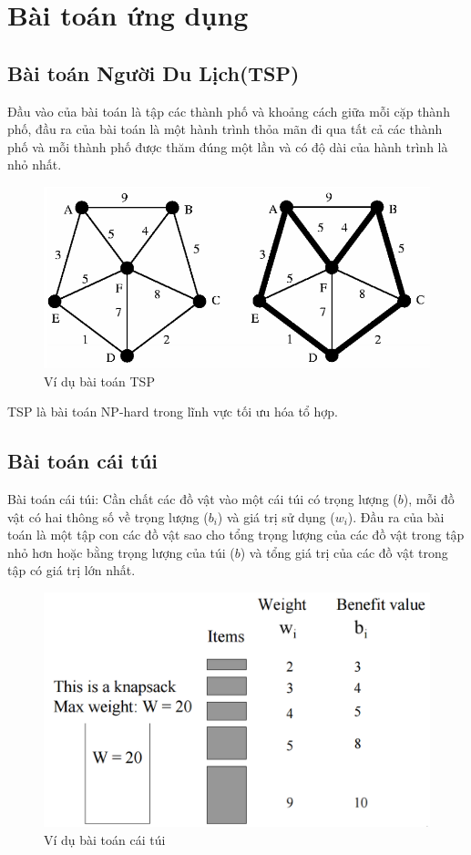 \documentclass[a4paper,12pt]{report}
\begin{document}
\section{Bài toán ứng dụng}
\subsection{Bài toán Người Du Lịch(TSP)}
Đầu vào của bài toán là tập các thành phố và khoảng cách giữa mỗi cặp thành phố, đầu ra của bài toán là một hành trình thỏa mãn đi qua tất cả các thành phố và mỗi thành phố được thăm đúng một lần và có độ dài của hành trình là nhỏ nhất.\\

\begin{figure}[H]
\center
\includegraphics[scale=0.5]{TSP_example.PNG}
\caption{Ví dụ bài toán TSP}
\end{figure}

TSP là bài toán NP-hard trong lĩnh vực tối ưu hóa tổ hợp.
\subsection{Bài toán cái túi}
Bài toán cái túi: Cần chất các đồ vật vào một cái túi có trọng lượng ($b$), mỗi đồ vật có hai thông số về trọng lượng ($b_i$) và giá trị sử dụng ($w_i$). Đầu ra của bài toán là một tập con các đồ vật sao cho tổng trọng lượng của các đồ vật trong tập nhỏ hơn hoặc bằng trọng lượng của túi ($b$) và tổng giá trị của các đồ vật trong tập có giá trị lớn nhất.
\begin{figure}[H]
\center
\includegraphics[scale=0.5]{KP_example.PNG}
\caption{Ví dụ bài toán cái túi}
\end{figure}
\end{document}

